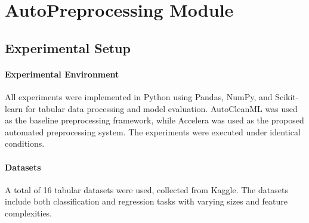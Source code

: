 \section{AutoPreprocessing Module}
\subsection{Experimental Setup}

\paragraph{Experimental Environment}\par

All experiments were implemented in Python using Pandas, NumPy, and Scikit-learn for tabular data processing and model evaluation. AutoCleanML was used as the baseline preprocessing framework, while Accelera was used as the proposed automated preprocessing system. The experiments were executed under identical conditions.

\paragraph{Datasets}\par

A total of 16 tabular datasets were used, collected from Kaggle. The datasets include both classification and regression tasks with varying sizes and feature complexities.

